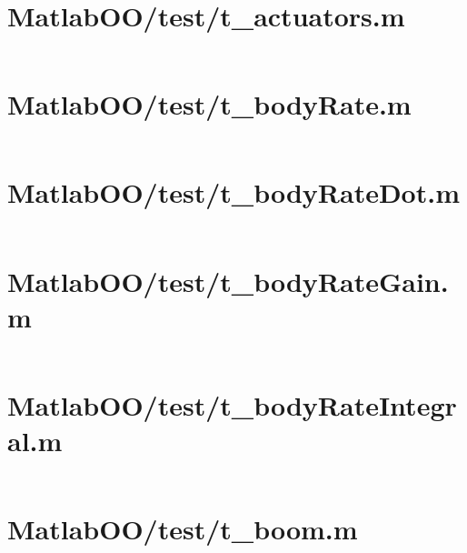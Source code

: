 \pagebreak
\section{MatlabOO/test/t\_actuators.m}\label{code:MatlabOO/test/t_actuators.m}
\inputminted[linenos,fontsize=\scriptsize]{matlab}{/home/dcouture/git/mathyourlife/TSatPy/beta_versions/matlab_object_oriented/test/t_actuators.m}

\pagebreak
\section{MatlabOO/test/t\_bodyRate.m}\label{code:MatlabOO/test/t_bodyRate.m}
\inputminted[linenos,fontsize=\scriptsize]{matlab}{/home/dcouture/git/mathyourlife/TSatPy/beta_versions/matlab_object_oriented/test/t_bodyRate.m}

\pagebreak
\section{MatlabOO/test/t\_bodyRateDot.m}\label{code:MatlabOO/test/t_bodyRateDot.m}
\inputminted[linenos,fontsize=\scriptsize]{matlab}{/home/dcouture/git/mathyourlife/TSatPy/beta_versions/matlab_object_oriented/test/t_bodyRateDot.m}

\pagebreak
\section{MatlabOO/test/t\_bodyRateGain.m}\label{code:MatlabOO/test/t_bodyRateGain.m}
\inputminted[linenos,fontsize=\scriptsize]{matlab}{/home/dcouture/git/mathyourlife/TSatPy/beta_versions/matlab_object_oriented/test/t_bodyRateGain.m}

\pagebreak
\section{MatlabOO/test/t\_bodyRateIntegral.m}\label{code:MatlabOO/test/t_bodyRateIntegral.m}
\inputminted[linenos,fontsize=\scriptsize]{matlab}{/home/dcouture/git/mathyourlife/TSatPy/beta_versions/matlab_object_oriented/test/t_bodyRateIntegral.m}

\pagebreak
\section{MatlabOO/test/t\_boom.m}\label{code:MatlabOO/test/t_boom.m}
\inputminted[linenos,fontsize=\scriptsize]{matlab}{/home/dcouture/git/mathyourlife/TSatPy/beta_versions/matlab_object_oriented/test/t_boom.m}

